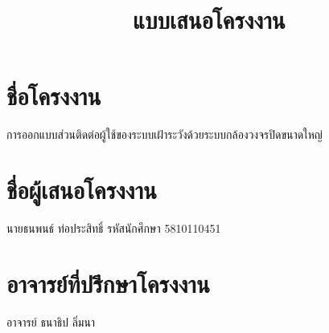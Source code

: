 \documentclass[a4paper, 12pt]{article}
\title{แบบเสนอโครงงาน}
\begin{document}
\maketitle
\newpage
\section{ชื่อโครงงาน}
การออกแบบส่วนติดต่อผู้ใช้ของระบบเฝ้าระวังด้วยระบบกล้องวงจรปิดขนาดใหญ่

\section{ชื่อผู้เสนอโครงงาน}
นายธนพนธ์ ท่อประสิทธิ์ รหัสนักศึกษา 5810110451

\section{อาจารย์ที่ปรึกษาโครงงาน}
อาจารย์ ธนาธิป ลิ่มนา














\end{document}

